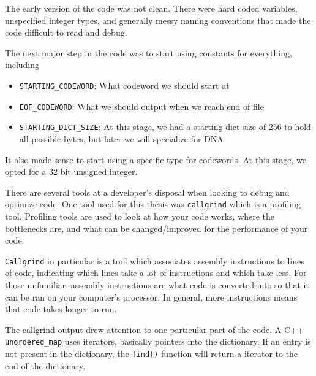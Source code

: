 \documentclass[12pt,twoside]{reedthesis}
\providecommand{\tightlist}{%
  \setlength{\itemsep}{0pt}\setlength{\parskip}{0pt}}
\begin{document}
The early version of the code was not clean. There were hard coded variables, unspecified integer types, and generally messy naming conventions that made the code difficult to read and debug.

The next major step in the code was to start using constants for everything, including
\begin{itemize}
\tightlist
\item
  \texttt{STARTING\_CODEWORD}: What codeword we should start at
\item
  \texttt{EOF\_CODEWORD}: What we should output when we reach end of file
\item
  \texttt{STARTING\_DICT\_SIZE}: At this stage, we had a starting dict size of 256 to hold all possible bytes, but later we will specialize for DNA
\end{itemize}
It also made sense to start using a specific type for codewords. At this stage, we opted for a 32 bit unsigned integer.

There are several tools at a developer's disposal when looking to debug and optimize code. One tool used for this thesis was \texttt{callgrind} which is a profiling tool. Profiling tools are used to look at how your code works, where the bottlenecks are, and what can be changed/improved for the performance of your code.

\texttt{Callgrind} in particular is a tool which associates assembly instructions to lines of code, indicating which lines take a lot of instructions and which take less. For those unfamiliar, assembly instructions are what code is converted into so that it can be ran on your computer's processor. In general, more instructions means that code takes longer to run.

The callgrind output drew attention to one particular part of the code. A C++ \texttt{unordered\_map} uses iterators, basically pointers into the dictionary. If an entry is not present in the dictionary, the \texttt{find()} function will return a iterator to the end of the dictionary.
\end{document}
